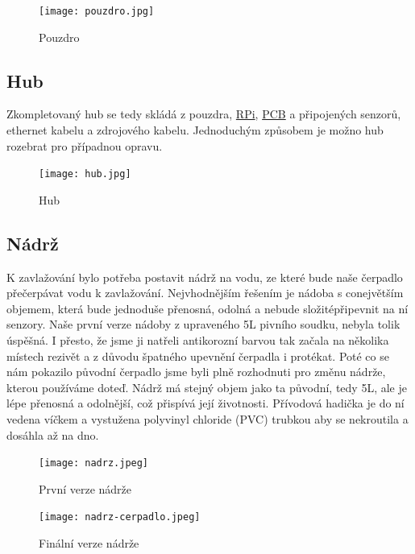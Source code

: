 \documentclass[czech,12pt,a4paper]{article}
\begin{document}
\vspace*{1cm}
\begin{figure}[h]
	\centering
	\texttt{[image: pouzdro.jpg]}
	\caption{Pouzdro}
	\label{fig:pouzdro}
\end{figure}

\subsection{Hub}

Zkompletovaný hub se tedy skládá z pouzdra, \underline{\ac{RPi}}, \underline{\ac{PCB}} a připojených senzorů, ethernet kabelu a zdrojového kabelu. Jednoduchým způsobem je možno hub rozebrat pro případnou opravu.

\vspace*{1cm}
\begin{figure}[h]
	\centering
	\texttt{[image: hub.jpg]}
	\caption{Hub}
\end{figure}

\clearpage

\subsection{Nádrž}

K zavlažování bylo potřeba postavit nádrž na vodu, ze které bude naše čerpadlo přečerpávat vodu k zavlažování. Nejvhodnějším řešením je nádoba s co\linebreak největším objemem, která bude jednoduše přenosná, odolná a nebude složité\linebreak připevnit na ní senzory. Naše první verze nádoby z upraveného 5L pivního soudku, nebyla tolik úspěšná. I přesto, že jsme ji natřeli antikorozní barvou tak začala na několika místech rezivět a z důvodu špatného upevnění čerpadla i protékat. Poté co se nám pokazilo původní čerpadlo jsme byli plně rozhodnuti pro změnu nádrže, kterou používáme doteď. Nádrž má stejný objem jako ta původní, tedy 5L, ale je lépe přenosná a odolnější, což přispívá její životnosti. Přívodová hadička je do ní vedena víčkem a vystužena polyvinyl chloride (PVC) trubkou aby se nekroutila a dosáhla až na dno.

\vspace*{1cm}
\begin{figure}[h]
	\begin{minipage}[t]{0.4\linewidth}
		\texttt{[image: nadrz.jpeg]}
		\caption{První verze nádrže}
	\end{minipage}
	\hfill
	\begin{minipage}[t]{0.6\linewidth}
		\texttt{[image: nadrz-cerpadlo.jpeg]}
		\caption{Finální verze nádrže}
	\end{minipage}
\end{figure}
\end{document}

